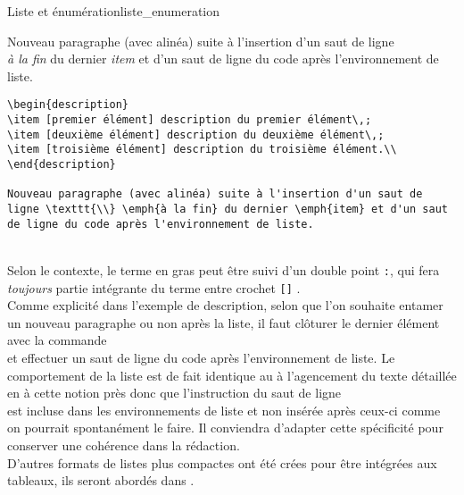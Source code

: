 \documentclass[a4paper, 11pt, twoside, fleqn]{memoir}
\begin{document}
\begin{exemple}{Liste et énumération}{liste_enumeration}
\begin{minipage}[t]{0.4\linewidth}
Nouveau paragraphe (avec alinéa) suite à l'insertion d'un saut de ligne \texttt{\\} \emph{à la fin} du dernier \emph{item} et d'un saut de ligne du code après l'environnement de liste.
\end{minipage}
\hfill
\begin{minipage}[t]{0.55\linewidth}
\begin{verbatim}
\begin{description}
\item [premier élément] description du premier élément\,;
\item [deuxième élément] description du deuxième élément\,;
\item [troisième élément] description du troisième élément.\\
\end{description}

Nouveau paragraphe (avec alinéa) suite à l'insertion d'un saut de ligne \texttt{\\} \emph{à la fin} du dernier \emph{item} et d'un saut de ligne du code après l'environnement de liste. 
\end{verbatim}
\end{minipage}\\

Selon le contexte, le terme en gras peut être suivi d'un double point \texttt{:}, qui fera \emph{toujours} partie intégrante du terme entre crochet \texttt{[]} .\\

Comme explicité dans l'exemple de description, selon que l'on souhaite entamer un nouveau paragraphe ou non après la liste, il faut clôturer le dernier élément avec la commande \texttt{\\} et effectuer un saut de ligne du code après l'environnement de liste. Le comportement de la liste est de fait identique au à l'agencement du texte détaillée en  à cette notion près donc que l'instruction du saut de ligne \texttt{\\} est incluse dans les environnements de liste et non insérée après ceux-ci comme on pourrait spontanément le faire. Il conviendra d'adapter cette spécificité pour conserver une cohérence dans la rédaction.\\

D'autres formats de listes plus compactes ont été crées pour être intégrées aux tableaux, ils seront abordés dans .

\end{exemple}
\end{document}
